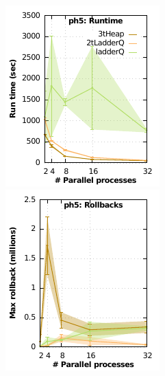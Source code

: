 \begin{figure}
\begin{minipage}{0.5\linewidth}
\begin{minipage}{0.49\linewidth}
\includegraphics[width=\linewidth]{images/ph5_Delay_10_Evt_10_run_time}
\end{minipage}
\begin{minipage}{0.49\linewidth}
\includegraphics[width=\linewidth]{images/ph5_Delay_10_Evt_10_rollbacks}

\end{minipage}
\end{minipage}
\end{figure}
